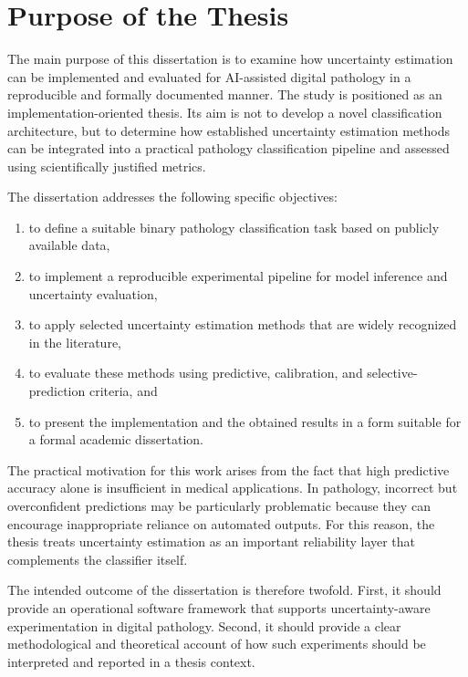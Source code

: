 \chapter{Purpose of the Thesis}
\label{chap:purpose}

The main purpose of this dissertation is to examine how uncertainty estimation can be implemented and evaluated for AI-assisted digital pathology in a reproducible and formally documented manner. The study is positioned as an implementation-oriented thesis. Its aim is not to develop a novel classification architecture, but to determine how established uncertainty estimation methods can be integrated into a practical pathology classification pipeline and assessed using scientifically justified metrics.

The dissertation addresses the following specific objectives:

\begin{enumerate}
    \item to define a suitable binary pathology classification task based on publicly available data,
    \item to implement a reproducible experimental pipeline for model inference and uncertainty evaluation,
    \item to apply selected uncertainty estimation methods that are widely recognized in the literature,
    \item to evaluate these methods using predictive, calibration, and selective-prediction criteria, and
    \item to present the implementation and the obtained results in a form suitable for a formal academic dissertation.
\end{enumerate}

The practical motivation for this work arises from the fact that high predictive accuracy alone is insufficient in medical applications. In pathology, incorrect but overconfident predictions may be particularly problematic because they can encourage inappropriate reliance on automated outputs. For this reason, the thesis treats uncertainty estimation as an important reliability layer that complements the classifier itself.

The intended outcome of the dissertation is therefore twofold. First, it should provide an operational software framework that supports uncertainty-aware experimentation in digital pathology. Second, it should provide a clear methodological and theoretical account of how such experiments should be interpreted and reported in a thesis context.
